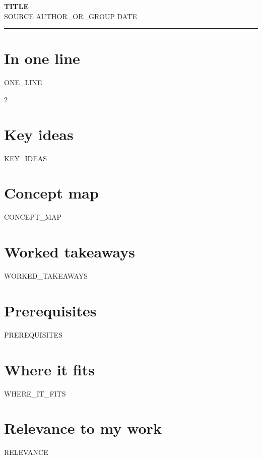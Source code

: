 \documentclass[10pt]{article}
\begin{document}
{\large\bfseries {{TITLE}}}\\[-2pt]
{\footnotesize {{SOURCE}} \hfill {{AUTHOR_OR_GROUP}} \hfill {{DATE}}}
\hrule\vspace{4pt}

\section*{In one line}
{{ONE_LINE}}

\begin{multicols}{2}
\section*{Key ideas}
{{KEY_IDEAS}}

\section*{Concept map}
{{CONCEPT_MAP}}

\section*{Worked takeaways}
{{WORKED_TAKEAWAYS}}

\section*{Prerequisites}
{{PREREQUISITES}}

\section*{Where it fits}
{{WHERE_IT_FITS}}

\section*{Relevance to my work}
{{RELEVANCE}}
\end{multicols}
\end{document}
